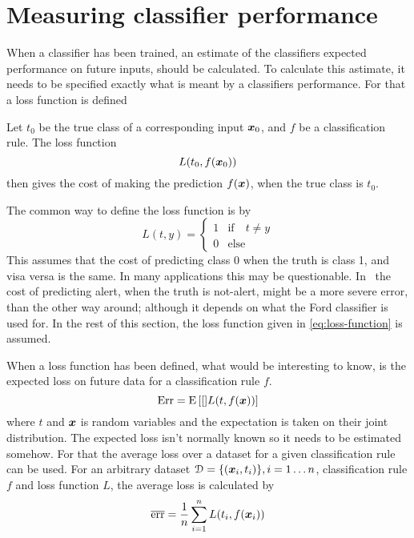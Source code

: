 \section{Measuring classifier performance}\label{sec:classifier-performance}
When a classifier has been trained, an estimate of the classifiers expected performance on future inputs, should be calculated. To calculate this astimate, it needs to be specified exactly what is meant by a classifiers performance. For that a loss function is defined
\begin{definition}
    Let $t_0$ be the true class of a corresponding input $\boldsymbol{x}_0$, and $f$ be a classification rule. The loss function
    \[
        L(t_0, f(\boldsymbol{x}_0))
    \]
    then gives the cost of making the prediction $f(\boldsymbol{x})$, when the true class is $t_0$.
\end{definition}
The common way to define the loss function is by
\begin{equation}\label{eq:loss-function}
    L(t, y) = \begin{cases}
        1 & \text{if}\quad t\neq y \\
        0 & \text{else}
    \end{cases}
\end{equation}
This assumes that the cost of predicting class 0 when the truth is class 1, and visa versa is the same. In many applications this may be questionable. In \TFC\ the cost of predicting alert, when the truth is not-alert, might be a more severe error, than the other way around; although it depends on what the Ford classifier is used for. In the rest of this section, the loss function given in \eqref{eq:loss-function} is assumed. \par
When a loss function has been defined, what would be interesting to know, is the expected loss on future data for a classification rule $f$.
\[
    \text{Err} = \text{E}\,[[]L(t, f(\boldsymbol{x}))]
\]
where $t$ and $\boldsymbol{x}$ is random variables and the expectation is taken on their joint distribution. The expected loss isn't normally known so it needs to be estimated somehow. For that the average loss over a dataset for a given classification rule can be used. For an arbitrary dataset $\mathcal{D}=\{(\boldsymbol{x}_i, t_i)\}, i=1\dots n$, classification rule $f$ and loss function $L$, the average loss is calculated by
\[
    \overline{\text{err}} = \frac{1}{n}\sum_{i=1}^n L(t_i, f(\boldsymbol{x}_i))
\]

